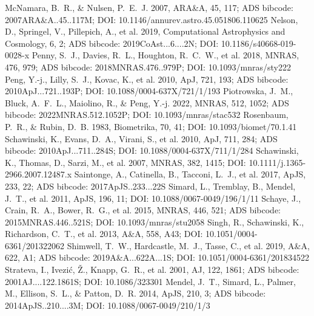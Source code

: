 \documentclass[twocolumn]{aastex631}
\begin{document}
\begin{thebibliography}{}
 McNamara, B.~R., \& Nulsen, P.~E.~J. 2007, ARA\&A, 45, 117; ADS bibcode: 2007ARA\&A..45..117M; DOI: 10.1146/annurev.astro.45.051806.110625
 Nelson, D., Springel, V., Pillepich, A., et al. 2019, Computational Astrophysics and Cosmology, 6, 2; ADS bibcode: 2019CoAst...6....2N; DOI: 10.1186/s40668-019-0028-x
 Penny, S.~J., Davies, R.~L., Houghton, R.~C.~W., et al. 2018, MNRAS, 476, 979; ADS bibcode: 2018MNRAS.476..979P; DOI: 10.1093/mnras/sty222
 Peng, Y.-j., Lilly, S.~J., Kovac, K., et al. 2010, ApJ, 721, 193; ADS bibcode: 2010ApJ...721..193P; DOI: 10.1088/0004-637X/721/1/193
 Piotrowska, J.~M., Bluck, A.~F.~L., Maiolino, R., \& Peng, Y.-j. 2022, MNRAS, 512, 1052; ADS bibcode: 2022MNRAS.512.1052P; DOI: 10.1093/mnras/stac532
 Rosenbaum, P.~R., \& Rubin, D.~B. 1983, Biometrika, 70, 41; DOI: 10.1093/biomet/70.1.41
 Schawinski, K., Evans, D.~A., Virani, S., et al. 2010, ApJ, 711, 284; ADS bibcode: 2010ApJ...711..284S; DOI: 10.1088/0004-637X/711/1/284
 Schawinski, K., Thomas, D., Sarzi, M., et al. 2007, MNRAS, 382, 1415; DOI: 10.1111/j.1365-2966.2007.12487.x
 Saintonge, A., Catinella, B., Tacconi, L.~J., et al. 2017, ApJS, 233, 22; ADS bibcode: 2017ApJS..233...22S
 Simard, L., Tremblay, B., Mendel, J.~T., et al. 2011, ApJS, 196, 11; DOI: 10.1088/0067-0049/196/1/11
 Schaye, J., Crain, R.~A., Bower, R.~G., et al. 2015, MNRAS, 446, 521; ADS bibcode: 2015MNRAS.446..521S; DOI: 10.1093/mnras/stu2058
 Singh, R., Schawinski, K., Richardson, C.~T., et al. 2013, A\&A, 558, A43; DOI: 10.1051/0004-6361/201322062
 Shimwell, T.~W., Hardcastle, M.~J., Tasse, C., et al. 2019, A\&A, 622, A1; ADS bibcode: 2019A\&A...622A...1S; DOI: 10.1051/0004-6361/201834522
 Strateva, I., Ivezi{\'c}, {\v Z}., Knapp, G.~R., et al. 2001, AJ, 122, 1861; ADS bibcode: 2001AJ....122.1861S; DOI: 10.1086/323301
 Mendel, J.~T., Simard, L., Palmer, M., Ellison, S.~L., \& Patton, D.~R. 2014, ApJS, 210, 3; ADS bibcode: 2014ApJS..210....3M; DOI: 10.1088/0067-0049/210/1/3

\end{thebibliography}
\end{document}
